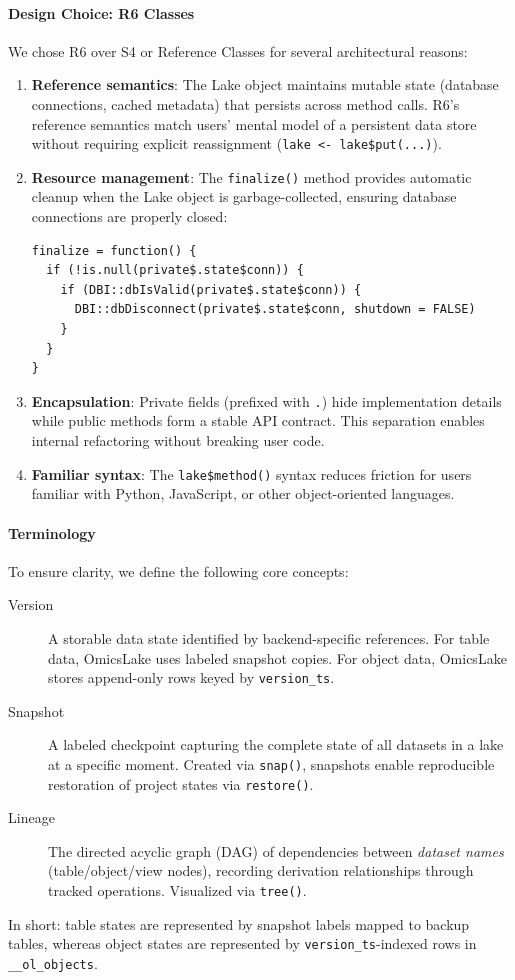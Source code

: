 \documentclass[11pt,a4paper]{article}
\begin{document}
\paragraph{Design Choice: R6 Classes}
We chose R6 over S4 or Reference Classes for several architectural reasons:

\begin{enumerate}
    \item \textbf{Reference semantics}: The Lake object maintains mutable state (database connections, cached metadata) that persists across method calls. R6's reference semantics match users' mental model of a persistent data store without requiring explicit reassignment (\texttt{lake <- lake\$put(...)}).

    \item \textbf{Resource management}: The \texttt{finalize()} method provides automatic cleanup when the Lake object is garbage-collected, ensuring database connections are properly closed:
\begin{lstlisting}[caption={Automatic resource cleanup via finalize()}]
finalize = function() {
  if (!is.null(private$.state$conn)) {
    if (DBI::dbIsValid(private$.state$conn)) {
      DBI::dbDisconnect(private$.state$conn, shutdown = FALSE)
    }
  }
}
\end{lstlisting}

    \item \textbf{Encapsulation}: Private fields (prefixed with \texttt{.}) hide implementation details while public methods form a stable API contract. This separation enables internal refactoring without breaking user code.

    \item \textbf{Familiar syntax}: The \texttt{lake\$method()} syntax reduces friction for users familiar with Python, JavaScript, or other object-oriented languages.
\end{enumerate}

\paragraph{Terminology}
To ensure clarity, we define the following core concepts:
\begin{description}
    \item[Version] A storable data state identified by backend-specific references. For table data, OmicsLake uses labeled snapshot copies. For object data, OmicsLake stores append-only rows keyed by \texttt{version\_ts}.
    \item[Snapshot] A labeled checkpoint capturing the complete state of all datasets in a lake at a specific moment. Created via \texttt{snap()}, snapshots enable reproducible restoration of project states via \texttt{restore()}.
    \item[Lineage] The directed acyclic graph (DAG) of dependencies between \emph{dataset names} (table/object/view nodes), recording derivation relationships through tracked operations. Visualized via \texttt{tree()}.
\end{description}
In short: table states are represented by snapshot labels mapped to backup tables, whereas object states are represented by \texttt{version\_ts}-indexed rows in \texttt{\_\_ol\_objects}.
\end{document}
